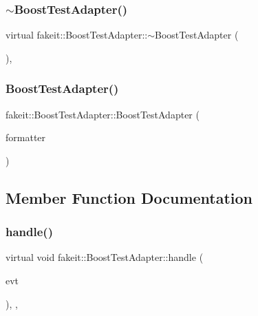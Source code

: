 \subsubsection{\texorpdfstring{$\sim$BoostTestAdapter()}{~BoostTestAdapter()}\hspace{0.1cm}{\footnotesize\ttfamily [2/2]}}
{\footnotesize\ttfamily virtual fakeit\+::\+Boost\+Test\+Adapter\+::$\sim$\+Boost\+Test\+Adapter (\begin{DoxyParamCaption}{ }\end{DoxyParamCaption})\hspace{0.3cm}{\ttfamily [virtual]}, {\ttfamily [default]}}

\mbox{\label{structfakeit_1_1BoostTestAdapter_a794ccd3414899a50dec8a1ec38bac988}} 
\subsubsection{\texorpdfstring{BoostTestAdapter()}{BoostTestAdapter()}\hspace{0.1cm}{\footnotesize\ttfamily [2/2]}}
{\footnotesize\ttfamily fakeit\+::\+Boost\+Test\+Adapter\+::\+Boost\+Test\+Adapter (\begin{DoxyParamCaption}\item[{\mbox{\hyperlink{structfakeit_1_1EventFormatter}{Event\+Formatter}} \&}]{formatter }\end{DoxyParamCaption})\hspace{0.3cm}{\ttfamily [inline]}}



\subsection{Member Function Documentation}
\mbox{\label{structfakeit_1_1BoostTestAdapter_a8c5e79f154223dce9fa9cbabd1bb3242}} 
\subsubsection{\texorpdfstring{handle()}{handle()}\hspace{0.1cm}{\footnotesize\ttfamily [1/6]}}
{\footnotesize\ttfamily virtual void fakeit\+::\+Boost\+Test\+Adapter\+::handle (\begin{DoxyParamCaption}\item[{const \mbox{\hyperlink{structfakeit_1_1UnexpectedMethodCallEvent}{Unexpected\+Method\+Call\+Event}} \&}]{evt }\end{DoxyParamCaption})\hspace{0.3cm}{\ttfamily [inline]}, {\ttfamily [override]}, {\ttfamily [virtual]}}



